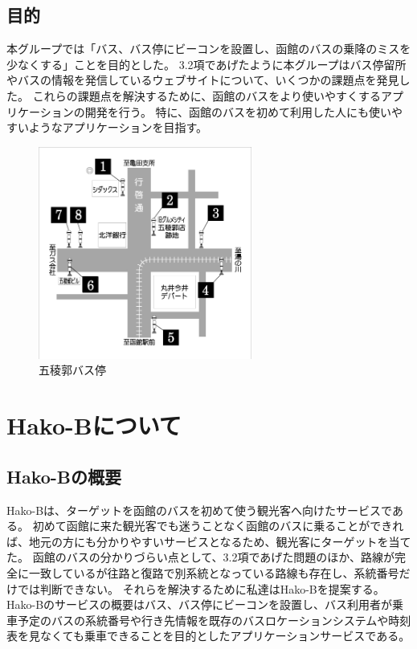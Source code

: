 \documentclass[openany,11pt,papersize]{jsbook}
\begin{document}

\section{目的}\label{sec:gaiyou}
本グループでは「バス、バス停にビーコンを設置し、函館のバスの乗降のミスを少なくする」ことを目的とした。
3.2項であげたように本グループはバス停留所やバスの情報を発信しているウェブサイトについて、いくつかの課題点を発見した。
これらの課題点を解決するために、函館のバスをより使いやすくするアプリケーションの開発を行う。
特に、函館のバスを初めて利用した人にも使いやすいようなアプリケーションを目指す。


\begin{figure}[htbp]
  \begin{center}
    \includegraphics[clip,width=7.0cm]{img/14007.jpg}
    \caption{五稜郭バス停}
    \label{fig:goryo}
  \end{center}
\end{figure}

\chapter{Hako-Bについて}

\section{Hako-Bの概要}
Hako-Bは、ターゲットを函館のバスを初めて使う観光客へ向けたサービスである。
初めて函館に来た観光客でも迷うことなく函館のバスに乗ることができれば、地元の方にも分かりやすいサービスとなるため、観光客にターゲットを当てた。
函館のバスの分かりづらい点として、3.2項であげた問題のほか、路線が完全に一致しているが往路と復路で別系統となっている路線も存在し、系統番号だけでは判断できない。
それらを解決するために私達はHako-Bを提案する。
Hako-Bのサービスの概要はバス、バス停にビーコンを設置し、バス利用者が乗車予定のバスの系統番号や行き先情報を既存のバスロケーションシステムや時刻表を見なくても乗車できることを目的としたアプリケーションサービスである。
\end{document}
